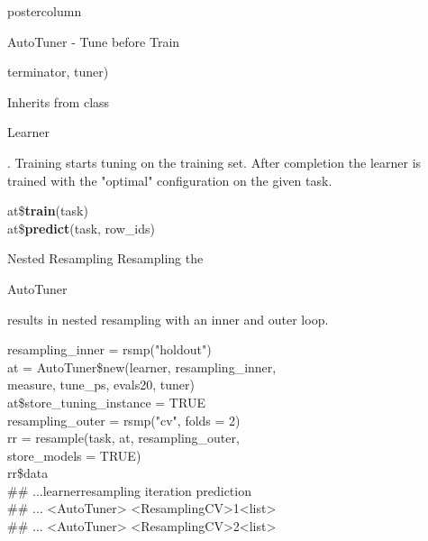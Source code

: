 \documentclass{beamer}
\newcommand{\codeinline}[1]{\begin{codeboxinline}#1\end{codeboxinline}}
\newcommand{\monospace}[1]{\multido{}{#1}{\space}}
\begin{document}
\begin{frame}[fragile]{}
\begin{columns}
\begin{column}{.245\textwidth}
\begin{beamercolorbox}[center]{postercolumn}
\begin{minipage}{.98\textwidth}
{\begin{myblock}{AutoTuner - Tune before Train}
\begin{codeboxmultiline}[width=24.5cm]
								\hspace*{1ex}terminator, tuner)
							\end{codeboxmultiline}
							\vspace{0.5em}
							Inherits from class \codeinline{Learner}.
							Training starts tuning on the training set.
							After completion the learner is trained with the "optimal" configuration on the given task.
							\\
							\begin{codeboxmultiline}[width=16.5cm]
								at\$\textbf{train}(task)\\
								at\$\textbf{predict}(task, row\_ids)
							\end{codeboxmultiline}
						\end{myblock}
						\begin{myblock}{Nested Resampling}
							Resampling the \codeinline{AutoTuner} results in nested resampling with an inner and outer loop.
							\\
							\begin{codeboxexample}
								{\scriptsize
									resampling\_inner = rsmp("holdout")
									\vspace{1em}
									\\
									at = AutoTuner\$new(learner, resampling\_inner, \\
									\hspace*{1ex}measure, tune\_ps, evals20, tuner) \\
									at\$store\_tuning\_instance = TRUE
									\vspace{1em}
									\\
									resampling\_outer = rsmp("cv", folds = 2)\\
									rr = resample(task, at, resampling\_outer, \\
									\hspace*{1ex}store\_models = TRUE)
									\vspace{1em}
									\\
									rr\$data\\
									\#\# ...\monospace{3}learner\monospace{5}resampling iteration
									prediction\\
									\#\# ... <AutoTuner> <ResamplingCV>\monospace{9}1\monospace{5}<list>\\
									\#\# ... <AutoTuner> <ResamplingCV>\monospace{9}2\monospace{5}<list>}
							\end{codeboxexample}
							\vspace{1em}
							\begin{codebox}

\end{codebox}
\end{myblock}}
\end{minipage}
\end{beamercolorbox}
\end{column}
\end{columns}
\end{frame}
\end{document}
